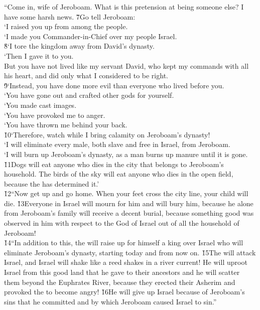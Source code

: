\begin{poetry}
\poeml ``Come in, wife of Jeroboam. What is this pretension at being someone else? I have some harsh news. \v{7}Go tell Jeroboam: \\
\poeml `I raised you up from among the people. \\
\poeml `I made you Commander-in-Chief over my people Israel. \\
\poeml \v{8}`I tore the kingdom away from David's dynasty. \\
\poeml `Then I gave it to you. \\
\poeml But you have not lived like my servant David, who kept my commands with all his heart, and did only what I considered to be right. \\
\poeml \v{9}`Instead, you have done more evil than everyone who lived before you. \\
\poeml `You have gone out and crafted other gods for yourself. \\
\poeml `You made cast images. \\
\poeml `You have provoked me to anger. \\
\poeml `You have thrown me behind your back. \\
\poeml \v{10}`Therefore, watch while I bring calamity on Jeroboam's dynasty! \\
\poeml `I will eliminate every male, both slave and free in Israel, from Jeroboam. \\
\poeml `I will burn up Jeroboam's dynasty, as a man burns up manure until it is gone. \v{11}Dogs will eat anyone who dies in the city that belongs to Jeroboam's household. The birds of the sky will eat anyone who dies in the open field, because the  has determined it.' \\
\poeml \v{12}``Now get up and go home. When your feet cross the city line, your child will die. \v{13}Everyone in Israel will mourn for him and will bury him, because he alone from Jeroboam's family will receive a decent burial, because something good was observed in him with respect to the  God of Israel out of all the household of Jeroboam! \\
\poeml \v{14}``In addition to this, the  will raise up for himself a king over Israel who will eliminate Jeroboam's dynasty, starting today and from now on. \v{15}The  will attack Israel, and Israel will shake like a reed shakes in a river current! He will uproot Israel from this good land that he gave to their ancestors and he will scatter them beyond the Euphrates River, because they erected their Asherim and provoked the  to become angry! \v{16}He will give up Israel because of Jeroboam's sins that he committed and by which Jeroboam caused Israel to sin.''
\end{poetry}

